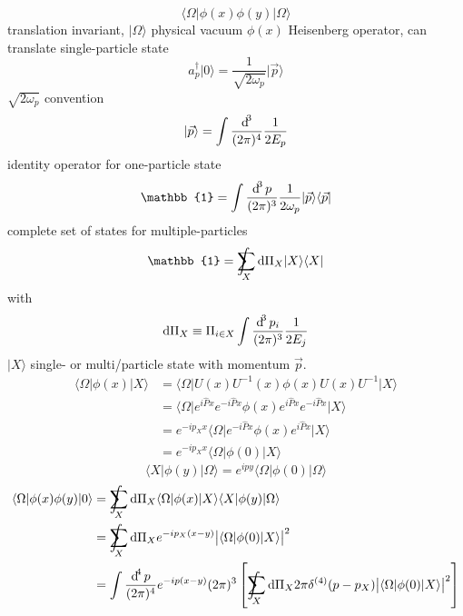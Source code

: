 \documentclass[../../index.tex]{subfiles}
\begin{document}
\begin{equation}
  \langle \Omega \vert \phi(x) \phi(y) \vert \Omega \rangle
\end{equation}
translation invariant, $\vert \Omega \rangle$ physical vacuum
$\phi(x)$ Heisenberg operator, can translate
single-particle state
\begin{equation}
  a_p^\dagger \vert 0 \rangle = \frac{1}{\sqrt{2 \omega_p}}\vert \vec p \rangle
\end{equation}
$\sqrt{2 \omega_p}$ convention
\begin{equation}
  \vert \vec p \rangle = \int \frac{\dif^3}{(2\pi)^4} \frac{1}{2E_p}
\end{equation}
identity operator for one-particle state
\begin{equation}
  \mathbb{1} = \int \frac{\dif^3 p}{(2\pi)^3} \frac{1}{2\omega_p} \vert \vec p \rangle \langle \vec p \vert
\end{equation}
complete set of states for multiple-particles
\begin{equation}
  \mathbb{1} = \intsum_{X} \dif \Pi_X \vert X \rangle \langle  X \vert
\end{equation}
with
\begin{equation}
  \dif \Pi_X \equiv \Pi_{i \in X} \int \frac{\dif^3 p_i}{(2\pi)^3} \frac{1}{2 E_j}
\end{equation}
$\vert X \rangle$ single- or multi\-/particle state with momentum $\vec p$.
\begin{equation}
  \begin{split}
    \langle  \Omega \vert \phi(x) \vert X \rangle &= \langle \Omega \vert U(x)U^{-1}(x) \phi(x) U(x)U^{-1} \vert X \rangle \\
    &=  \langle \Omega \vert e^{i \hat P x}e^{-i \hat P x} \phi(x) e^{i \hat P x}e^{-i \hat P x} \vert X \rangle \\
    &= e^{-i p_X x} \langle \Omega \vert e^{-i \hat P x} \phi(x) e^{i \hat P x} \vert X \rangle \\
    &= e^{-i p_X x} \langle \Omega \vert \phi(0) \vert X \rangle
  \end{split} 
\end{equation}
\begin{equation}
  \langle X \vert \phi(y) \vert \Omega \rangle = e^{ipy} \langle \Omega \vert \phi(0) \vert \Omega \rangle
\end{equation}
\begin{equation}
  \begin{split}
    \langle \Omega \vert \phi(x) \phi(y) \vert 0 \rangle
    &= \intsum_X \dif \Pi_X \langle \Omega \vert \phi(x) \vert X \rangle \langle X \vert \phi(y) \vert \Omega \rangle \\
    &= \intsum_X \dif \Pi_X e^{-i p_X (x-y)} \abs{\langle \Omega \vert \phi(0) \vert X \rangle}^2  \\
    &= \int \frac{\dif^4 p}{(2\pi)^4} e^{-i p (x-y)} (2\pi)^3 \left[
      \intsum_X \dif \Pi_X  2\pi \delta^{(4)}(p-p_X) \abs{\langle \Omega \vert \phi(0) \vert X \rangle}^2 \right]
  \end{split}
\end{equation}
\end{document}
